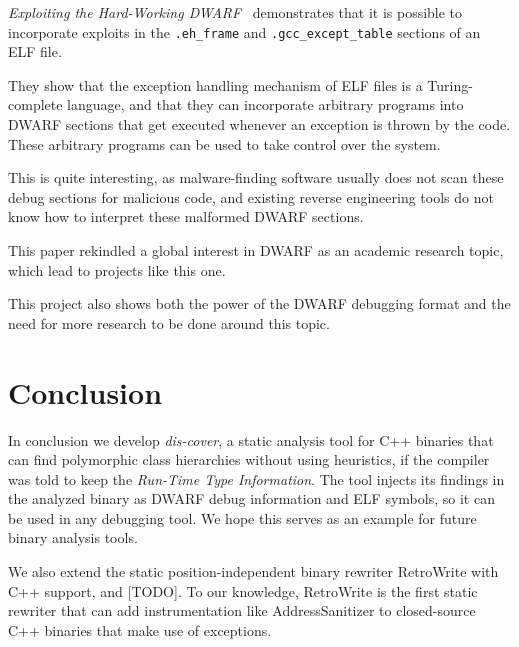 \documentclass[a4paper,11pt,oneside]{report}
\begin{document}
\emph{Exploiting the Hard-Working DWARF}~\cite{hardworkingdwarf}
demonstrates that it is possible to incorporate exploits in the
\texttt{.eh\_frame} and \texttt{.gcc\_except\_table} sections of an ELF file.

They show that the exception handling mechanism of ELF files is a
Turing-complete language, and that they can incorporate arbitrary programs
into DWARF sections that get executed whenever an exception is thrown by the
code.
These arbitrary programs can be used to take control over the system.

This is quite interesting, as malware-finding software usually does not scan
these debug sections for malicious code, and existing reverse engineering
tools do not know how to interpret these malformed DWARF sections.

This paper rekindled a global interest in DWARF as an academic research topic,
which lead to projects like this one.

This project also shows both the power of the DWARF debugging format and the
need for more research to be done around this topic.

\chapter{Conclusion}


In conclusion we develop \emph{dis-cover}, a static analysis tool for C++
binaries that can find polymorphic class hierarchies without using heuristics,
if the compiler was told to keep the \emph{Run-Time Type Information}.
The tool injects its findings in the analyzed binary as DWARF debug
information and ELF symbols, so it can be used in any debugging tool.
We hope this serves as an example for future binary analysis tools.

We also extend the static position-independent binary rewriter RetroWrite with
C++ support, and [TODO].
To our knowledge, RetroWrite is the first static rewriter that can add
instrumentation like AddressSanitizer to closed-source C++ binaries that make
use of exceptions.

\cleardoublepage
{}
{}
\printbibliography

%
%
\end{document}
